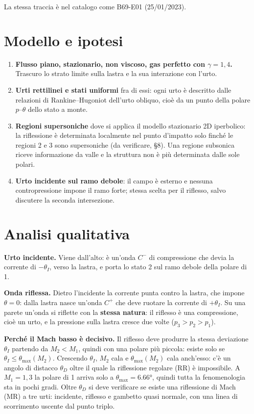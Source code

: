 \documentclass[11pt,a4paper]{article}
\newcommand{\Cp}{C^{+}}
\newcommand{\Cm}{C^{-}}
\begin{document}
La stessa traccia è nel catalogo come B69-E01 (25/01/2023).

\section{Modello e ipotesi}
\begin{enumerate}
\item \textbf{Flusso piano, stazionario, non viscoso, gas perfetto con $\gamma=1{,}4$.} Trascuro lo strato limite
  sulla lastra e la sua interazione con l'urto.
\item \textbf{Urti rettilinei e stati uniformi} fra di essi: ogni urto è descritto dalle relazioni di
  Rankine--Hugoniot dell'urto obliquo, cioè da un punto della polare $p$--$\theta$ dello stato a monte.
\item \textbf{Regioni supersoniche} dove si applica il modello stazionario 2D iperbolico: la riflessione è
  determinata localmente nel punto d'impatto solo finché le regioni 2 e 3 sono supersoniche (da verificare, §8).
  Una regione subsonica riceve informazione da valle e la struttura non è più determinata dalle sole polari.
\item \textbf{Urto incidente sul ramo debole}: il campo è esterno e nessuna contropressione impone il ramo forte;
  stessa scelta per il riflesso, salvo discutere la seconda intersezione.
\end{enumerate}

\section{Analisi qualitativa}
\textbf{Urto incidente.} Viene dall'alto: è un'onda $\Cm$ di compressione che devia la corrente di $-\theta_I$,
verso la lastra, e porta lo stato 2 sul ramo debole della polare di 1.

\textbf{Onda riflessa.} Dietro l'incidente la corrente punta contro la lastra, che impone $\theta=0$: dalla lastra
nasce un'onda $\Cp$ che deve ruotare la corrente di $+\theta_I$. Su una parete un'onda si riflette con la
\textbf{stessa natura}: il riflesso è una compressione, cioè un urto, e la pressione sulla lastra cresce due
volte ($p_3>p_2>p_1$).

\textbf{Perché il Mach basso è decisivo.} Il riflesso deve produrre la stessa deviazione $\theta_I$ partendo da
$M_2<M_1$, quindi con una polare più piccola: esiste solo se $\theta_I\le\theta_{\max}(M_2)$. Crescendo $\theta_I$,
$M_2$ cala e $\theta_{\max}(M_2)$ cala anch'esso: c'è un angolo di distacco $\theta_D$ oltre il quale la riflessione
regolare (RR) è impossibile. A $M_1=1{,}3$ la polare di 1 arriva solo a $\theta_{\max}=\ang{6.66}$, quindi tutta la
fenomenologia sta in pochi gradi. Oltre $\theta_D$ si deve verificare se esiste una riflessione di Mach (MR) a tre
urti: incidente, riflesso e gambetto quasi normale, con una linea di scorrimento uscente dal punto triplo.
\end{document}
